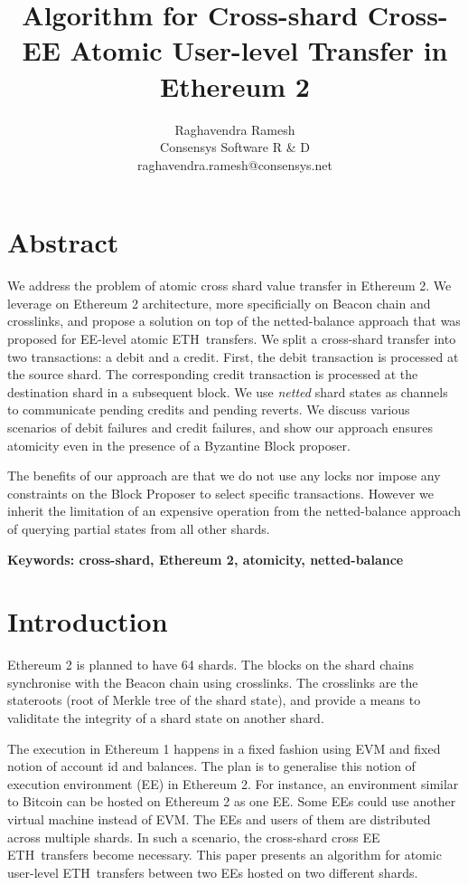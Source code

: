 \documentclass{article}
\title{Algorithm for Cross-shard Cross-EE Atomic User-level \eth Transfer in Ethereum 2}
\author{Raghavendra Ramesh\\Consensys Software R \& D\\raghavendra.ramesh@consensys.net}
\date{}
\newcommand{\eth}[0]{ETH~}
\begin{document}
\maketitle

\section*{Abstract}
We address the problem of atomic cross shard value transfer in Ethereum 2. We leverage on Ethereum 2 architecture, more specificially on Beacon chain and crosslinks, and propose a solution on top of the netted-balance approach that was proposed for EE-level atomic \eth transfers. We split a cross-shard transfer into two transactions: a debit and a credit. First, the debit transaction is processed at the source shard. The corresponding credit transaction is processed at the destination shard in a subsequent block. We use {\em netted} shard states as channels to communicate pending credits and pending reverts. We discuss various scenarios of debit failures and credit failures, and show our approach ensures atomicity even in the presence of a Byzantine Block proposer. 

The benefits of our approach are that we do not use any locks nor impose any constraints on the Block Proposer to select specific transactions. However we inherit the limitation of an expensive operation from the netted-balance approach of querying partial states from all other shards.

\bigskip

{\bf Keywords: cross-shard, Ethereum 2, atomicity, netted-balance}

\section{Introduction}

Ethereum 2 is planned to have 64 shards. The blocks on the shard chains synchronise with the Beacon chain using crosslinks. The crosslinks are the stateroots (root of Merkle tree of the shard state), and provide a means to validitate the integrity of a shard state on another shard. 

The execution in Ethereum 1 happens in a fixed fashion using EVM and fixed notion of account id and balances. The plan is to generalise this notion of execution environment (EE) in Ethereum 2. For instance, an environment similar to Bitcoin can be hosted on Ethereum 2 as one EE.  Some EEs could use another virtual machine instead of EVM. The EEs and users of them are distributed across multiple shards. In such a scenario, the cross-shard cross EE \eth transfers become necessary. This paper presents an algorithm for atomic user-level \eth transfers between two EEs hosted on two different shards.
\end{document}
